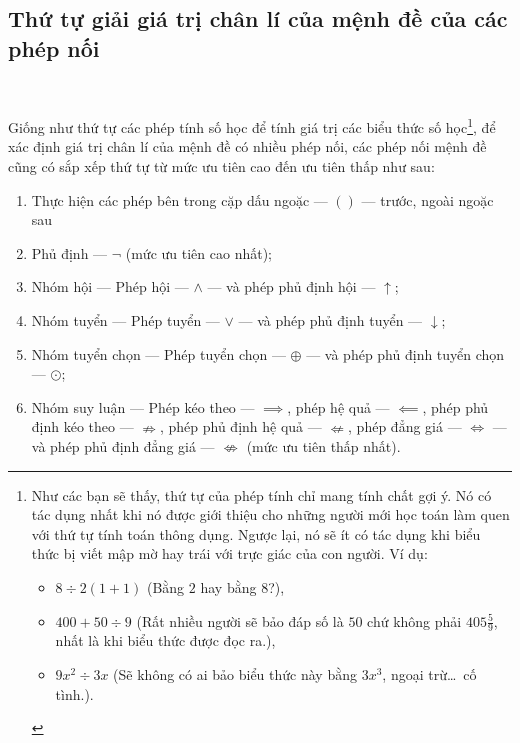 \subsection{Thứ tự giải giá trị chân lí của mệnh đề của các phép nối}

\ %

Giống như thứ tự các phép tính số học để tính giá trị các biểu thức số học\footnote{Như các bạn sẽ thấy, thứ tự của phép tính chỉ mang tính chất gợi ý. Nó có tác dụng nhất khi nó được giới thiệu cho những người mới học toán làm quen với thứ tự tính toán thông dụng. Ngược lại, nó sẽ ít có tác dụng khi biểu thức bị viết mập mờ hay trái với trực giác của con người. Ví dụ:
\begin{itemize}
   \item $8 \div 2(1+1)$ (Bằng $2$ hay bằng $8$?),
   \item $400 + 50 \div 9$ (Rất nhiều người sẽ bảo đáp số là $50$ chứ không phải $405\frac{5}{9}$, nhất là khi biểu thức được đọc ra.),
   \item $9x^2 \div 3x$ (Sẽ không có ai bảo biểu thức này bằng $3x^3$, ngoại trừ\dots\ cố tình.).
\end{itemize}
}, để xác định giá trị chân lí của mệnh đề có nhiều phép nối, các phép nối mệnh đề cũng có sắp xếp thứ tự từ mức ưu tiên cao đến ưu tiên thấp như sau:
\begin{enumerate}[start=0]
   \item Thực hiện các phép bên trong cặp dấu ngoặc --- $()$ --- trước, ngoài ngoặc sau
   \item Phủ định --- $\neg$ (mức ưu tiên cao nhất);
   \item Nhóm hội --- Phép hội --- $\land$ --- và phép phủ định hội --- $\uparrow$;
   \item Nhóm tuyển --- Phép tuyển --- $\lor$ --- và phép phủ định tuyển --- $\downarrow$;
   \item Nhóm tuyển chọn --- Phép tuyển chọn --- $\oplus$ --- và phép phủ định tuyển chọn --- $\odot$;
   \item Nhóm suy luận --- Phép kéo theo --- $\implies$, phép hệ quả --- $\impliedby$, phép phủ định kéo theo --- $\nRightarrow$, phép phủ định hệ quả --- $\nLeftarrow$, phép đẳng giá --- $\iff$ --- và phép phủ định đẳng giá --- $\nLeftrightarrow$ (mức ưu tiên thấp nhất).
\end{enumerate}
